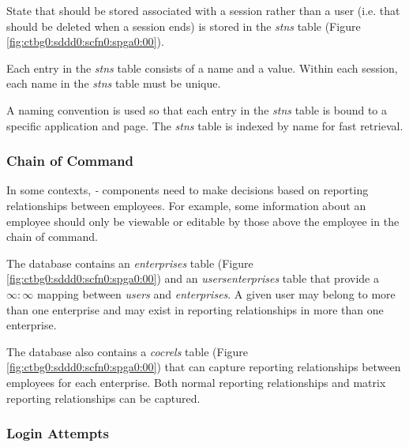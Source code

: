 State that should be stored associated with a session rather than a user
(i.e. that should be deleted when a session ends) is stored in the
\emph{stns} table (Figure \ref{fig:ctbg0:sddd0:scfn0:spga0:00}).

Each entry in the \emph{stns} table consists of a name and a value.
Within each session, each name in the \emph{stns} table must be unique.

A naming convention is used so that each entry in the \emph{stns} table
is bound to a specific application and page.  The \emph{stns} table is indexed
by name for fast retrieval.


\subsubsection{Chain of Command}
\label{ctbg0:sddd0:scfn0:scoc0}

In some contexts, \emph{\productbasename{}-\productversion{}} components
need to make decisions based on reporting relationships between
employees.  For example, some information about an employee should only
be viewable or editable by those above the employee in the chain of command.

The database contains an \emph{enterprises} table
(Figure \ref{fig:ctbg0:sddd0:scfn0:spga0:00}) and an
\emph{usersenterprises} table that provide a 
$\infty{}:\infty{}$ mapping between \emph{users}
and \emph{enterprises}.  A given user may belong to more than one 
enterprise and may exist in reporting relationships in more than
one enterprise.

The database also contains a \emph{cocrels} table
(Figure \ref{fig:ctbg0:sddd0:scfn0:spga0:00}) that can capture
reporting relationships between employees for each enterprise.  
Both normal reporting relationships
and matrix reporting relationships can be captured.


\subsubsection{Login Attempts}
\label{ctbg0:sddd0:scfn0:slat0}

